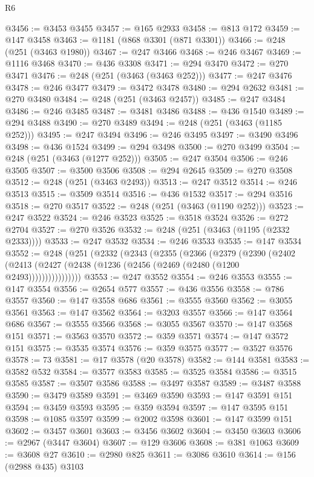 \begin{lexlean}{R6}
\begin{coremodule}
@3456 := @3453 @3455
@3457 := @165 @2933
@3458 := @813 @172
@3459 := @147 @3458
@3463 := @1181 (@868 @3301 (@871 @3301))
@3466 := @248 (@251 (@3463 @1980))
@3467 := @247 @3466
@3468 := @246 @3467
@3469 := @1116 @3468
@3470 := @436 @3308
@3471 := @294 @3470
@3472 := @270 @3471
@3476 := @248 (@251 (@3463 (@3463 @252)))
@3477 := @247 @3476
@3478 := @246 @3477
@3479 := @3472 @3478
@3480 := @294 @2632
@3481 := @270 @3480
@3484 := @248 (@251 (@3463 @2457))
@3485 := @247 @3484
@3486 := @246 @3485
@3487 := @3481 @3486
@3488 := @436 @1540
@3489 := @294 @3488
@3490 := @270 @3489
@3494 := @248 (@251 (@3463 (@1185 @252)))
@3495 := @247 @3494
@3496 := @246 @3495
@3497 := @3490 @3496
@3498 := @436 @1524
@3499 := @294 @3498
@3500 := @270 @3499
@3504 := @248 (@251 (@3463 (@1277 @252)))
@3505 := @247 @3504
@3506 := @246 @3505
@3507 := @3500 @3506
@3508 := @294 @2645
@3509 := @270 @3508
@3512 := @248 (@251 (@3463 @2493))
@3513 := @247 @3512
@3514 := @246 @3513
@3515 := @3509 @3514
@3516 := @436 @1532
@3517 := @294 @3516
@3518 := @270 @3517
@3522 := @248 (@251 (@3463 (@1190 @252)))
@3523 := @247 @3522
@3524 := @246 @3523
@3525 := @3518 @3524
@3526 := @272 @2704
@3527 := @270 @3526
@3532 := @248 (@251 (@3463 (@1195 (@2332 @2333))))
@3533 := @247 @3532
@3534 := @246 @3533
@3535 := @147 @3534
@3552 := @248
    (@251
      (@2332
        (@2343
          (@2355
            (@2366
              (@2379
                (@2390
                  (@2402
                    (@2413 (@2427 (@2438 (@1236 (@2456 (@2469 (@2480 (@1200 @2493))))))))))))))))
@3553 := @247 @3552
@3554 := @246 @3553
@3555 := @147 @3554
@3556 := @2654 @577
@3557 := @436 @3556
@3558 := @786 @3557
@3560 := @147 @3558 @686
@3561 := @3555 @3560
@3562 := @3055 @3561
@3563 := @147 @3562
@3564 := @3203 @3557
@3566 := @147 @3564 @686
@3567 := @3555 @3566
@3568 := @3055 @3567
@3570 := @147 @3568 @151
@3571 := @3563 @3570
@3572 := @359 @3571
@3574 := @147 @3572 @151
@3575 := @3535 @3574
@3576 := @359 @3575
@3577 := @3527 @3576
@3578 := 73
@3581 := @17 @3578 (@20 @3578)
@3582 := @144 @3581
@3583 := @3582 @532
@3584 := @3577 @3583
@3585 := @3525 @3584
@3586 := @3515 @3585
@3587 := @3507 @3586
@3588 := @3497 @3587
@3589 := @3487 @3588
@3590 := @3479 @3589
@3591 := @3469 @3590
@3593 := @147 @3591 @151
@3594 := @3459 @3593
@3595 := @359 @3594
@3597 := @147 @3595 @151
@3598 := @1085 @3597
@3599 := @2002 @3598
@3601 := @147 @3599 @151
@3602 := @3457 @3601
@3603 := @3456 @3602
@3604 := @3450 @3603
@3606 := @2967 (@3447 @3604)
@3607 := @129 @3606
@3608 := @381 @1063
@3609 := @3608 @27
@3610 := @2980 @825
@3611 := @3086 @3610
@3614 := @156 (@2988 @435) @3103

\end{coremodule}
\end{lexlean}
